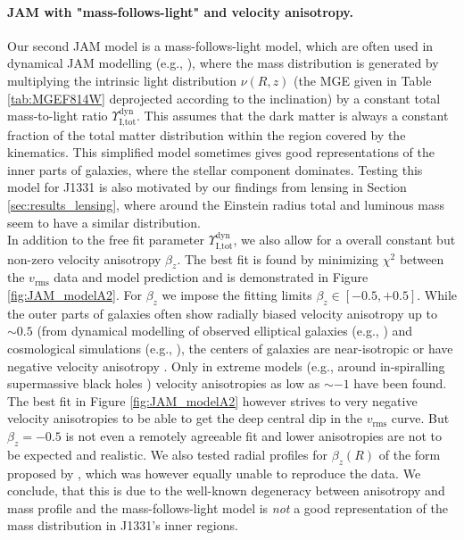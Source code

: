 \paragraph{JAM with "mass-follows-light" and velocity anisotropy.} Our second JAM model is a mass-follows-light model, which are often used in dynamical JAM modelling (e.g., \citet{GlennEC,Cap06}), where the mass distribution is generated by multiplying the intrinsic light distribution $\nu(R,z)$ (the MGE given in Table \ref{tab:MGEF814W} deprojected according to the inclination) by a constant total mass-to-light ratio  $\Upsilon_\text{I,tot}^\text{dyn}$. This assumes that the dark matter is always a constant fraction of the total matter distribution within the region covered by the kinematics. This simplified model sometimes gives good representations of the inner parts of galaxies, where the stellar component dominates. Testing this model for J1331 is also motivated by our findings from lensing in Section \ref{sec:results_lensing}, where around the Einstein radius total and luminous mass seem to have a similar distribution.
\\In addition to the free fit parameter  $\Upsilon_\text{I,tot}^\text{dyn}$, we also allow for a overall constant but non-zero velocity anisotropy $\beta_z$. The best fit is found by minimizing $\chi^2$ between the $v_\text{rms}$ data and model prediction and is demonstrated in Figure \ref{fig:JAM_modelA2}. For $\beta_z$ we impose the fitting limits $\beta_z \in [-0.5,+0.5]$. While the outer parts of galaxies often show radially biased velocity anisotropy up to $\sim 0.5$ (from dynamical modelling of observed elliptical galaxies (e.g., \citet{Kronawitter2000}) and cosmological simulations (e.g., \citet{2004MNRAS.352..535D,2001ApJ...557..533F}), the centers of galaxies are near-isotropic or have  negative velocity anisotropy \citep{2003ApJ...583...92G}. Only in extreme models (e.g., around in-spiralling supermassive black holes \citep{1997NewA....2..533Q}) velocity anisotropies as low as $\sim -1$ have been found. The best fit in Figure \ref{fig:JAM_modelA2} however strives to very negative velocity anisotropies to be able to get the deep central dip in the  $v_\text{rms}$ curve. But $\beta_z = -0.5$ is not even a remotely agreeable fit and lower anisotropies are not to be expected and realistic. We also tested radial profiles for $\beta_z(R)$ of the form proposed by \citet{BaesVanHese}, which was however equally unable to reproduce the data. We conclude, that this is due to the well-known degeneracy between anisotropy and mass profile \Wilma{[TO DO: REF]} and the mass-follows-light model is \emph{not} a good representation of the mass distribution in J1331's inner regions.

